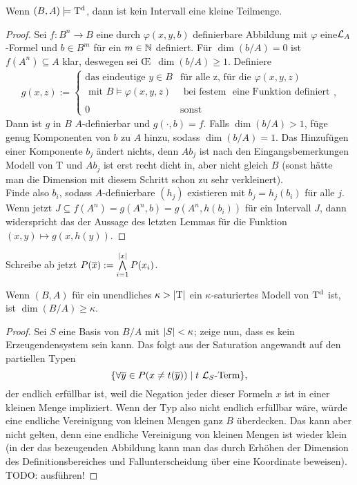 \begin{theorem}\label{Kleinheit}
	Wenn $(B,A)\models\operatorname{T^d}$, dann ist kein Intervall eine kleine Teilmenge.
\end{theorem}
\begin{proof}
	Sei $f:B^n\rightarrow B$ eine durch $\varphi(x,y,b)$ definierbare Abbildung mit $\varphi$ eine\linebreak$\mathcal{L}_A$-Formel und $b\in B^m$ für ein $m\in\mathbb{N}$ definiert. Für $\dim(b/A)=0$ ist $f(A^n)\subseteq A$ klar, deswegen sei \OE\ $\dim(b/A)\geq1$. Definiere
	\begin{align*}
	g(x,z):=\left\{\begin{array}{ll}
	\text{das eindeutige }y\in B &\text{für alle z, für die }\varphi(x,y,z)\\
	\text{ mit }B\models\varphi(x,y,z) &\text{ bei festem }\text{ eine Funktion definiert}\\
	\ &\ \\
	0 &\text{sonst}
	\end{array}\right.,
	\end{align*}
	Dann ist $g$ in $B$ $A$-definierbar und $g(\cdot,b)=f$. Falls $\dim(b/A)>1$, füge genug Komponenten von $b$ zu $A$ hinzu, sodass $\dim(b/A)=1$. Das Hinzufügen einer Komponente $b_j$ ändert nichts, denn $Ab_j$ ist nach den Eingangsbemerkungen Modell von T und $Ab_j$ ist erst recht dicht in, aber nicht gleich $B$ (sonst hätte man die Dimension mit diesem Schritt schon zu sehr verkleinert).\\
	Finde also $b_i$, sodass $A$-definierbare $(h_j)$ existieren mit $b_j=h_j(b_i)$ für alle $j$. Wenn jetzt $J\subseteq f(A^n)=g(A^n,b)=g(A^n,h(b_i))$ für ein Intervall $J$, dann widerspricht das der Aussage des letzten Lemmas für die Funktion $(x,y)\mapsto g(x,h(y))$.
\end{proof}

\begin{definition}
	Schreibe ab jetzt $P(\overline{x}):=\bigwedge\limits_{i=1}^{\left| x \right|}P(x_i)$.
\end{definition}

\newpage

\begin{lemma}
	Wenn $(B,A)$ für ein unendliches $\kappa>{\left| \operatorname{T} \right|}$ ein $\kappa$-saturiertes Modell von $\operatorname{T^d}$ ist, ist $\dim(B/A)\geq\kappa$.
\end{lemma}
\begin{proof}
	Sei $S$ eine Basis von $B/A$ mit ${\left| S \right|}<\kappa$; zeige nun, dass es kein Erzeugendensystem sein kann. Das folgt aus der Saturation angewandt auf den partiellen Typen $$\{\forall\overline{y}\in P(x\neq t(\overline{y}))\mid t\ \mathcal{L}_S\text{-Term}\},$$ der endlich erfüllbar ist, weil die Negation jeder dieser Formeln \glqq{}$x$ ist in einer kleinen Menge\grqq{} impliziert. Wenn der Typ also nicht endlich erfüllbar wäre, würde eine endliche Vereinigung von kleinen Mengen ganz $B$ überdecken. Das kann aber nicht gelten, denn eine endliche Vereinigung von kleinen Mengen ist wieder klein (in der das bezeugenden Abbildung kann man das durch Erhöhen der Dimension des Definitionsbereiches und Fallunterscheidung über eine Koordinate beweisen). TODO: ausführen!
\end{proof}

